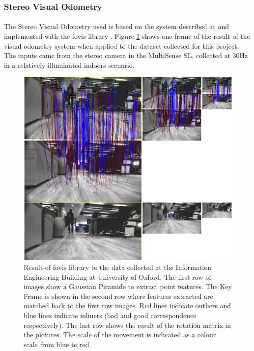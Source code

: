 \documentclass[11pt]{article}
\begin{document}
	\subsubsection*{Stereo Visual Odometry}
	\paragraph{}
	The Stereo Visual Odometry used is based on the system described at \cite{VisualOdometry} and implemented with the fovis library \cite{fovis}. Figure \ref{fig:VisualOdometry1} shows one frame of the result of the visual odometry system when applied to the dataset collected for this project. The inputs came from the stereo camera in the MultiSense SL, collected at 30Hz in a relatively illuminated indoors scenario.
	
	\begin{figure}
	\begin{minipage}{0.65\textwidth}
		\centering
		\includegraphics[width=\textwidth]{VisualOdometry1}
	\end{minipage} \hfill
	\begin{minipage}{0.35\textwidth}
		\centering
		\caption[t]{Result of fovis library to the data collected at the Information Engineering Building at University of Oxford. The first row of images show a Gaussian Piramide to extract point features. The Key Frame is shown in the second row where features extracted are matched back to the first row images. Red lines indicate outliers and blue lines indicate inliners (bad and good correspondence respectively). The last row shows the result of the rotation matrix in the pictures. The scale of the movement is indicated as a colour scale from blue to red.}
		\label{fig:VisualOdometry1}	
	\end{minipage}				
	\end{figure}
\end{document}
